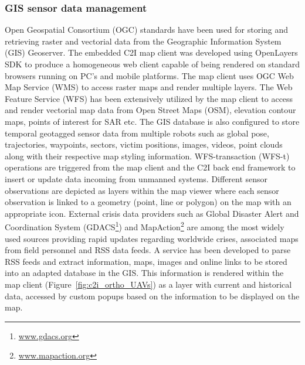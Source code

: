 \documentclass{article}
\begin{document}
\subsubsection{GIS sensor data management}
Open Geospatial Consortium (OGC) standards have been used for storing and retrieving raster and vectorial data from the Geographic Information System (GIS) Geoserver.
The embedded C2I map client was developed using OpenLayers SDK to produce a homogeneous web client capable of being rendered on standard browsers running on PC's and mobile platforms.
The map client uses OGC Web Map Service (WMS) to access raster maps and render multiple layers.
The Web Feature Service (WFS) has been extensively utilized by the map client to access and render vectorial map data from Open Street Maps (OSM), elevation contour maps, points of interest for SAR etc.
The GIS database is also configured to store temporal geotagged sensor data from multiple robots such as global pose, trajectories, waypoints, sectors, victim positions, images, videos, point clouds along with their respective map styling information.
WFS-transaction (WFS-t) operations are triggered from the map client and the C2I back end framework to insert or update data incoming from unmanned systems.
Different sensor observations are depicted as layers within the map viewer where each sensor observation is linked to a geometry (point, line or polygon) on the map with an appropriate icon.
External crisis data providers such as Global Disaster Alert and Coordination System (GDACS\footnote{\url{ www.gdacs.org}}) and MapAction\footnote{\url{ www.mapaction.org}} are among the most widely used sources providing rapid updates regarding worldwide crises, associated maps from field personnel and RSS data feeds.
A service has been developed to parse RSS feeds and extract information, maps, images and online links to be stored into an adapted database in the GIS.
This information is rendered within the map client (Figure~\ref{fig:c2i_ortho_UAVs}) as a layer with current and historical data, accessed by custom popups based on the information to be displayed on the map.
\end{document}
